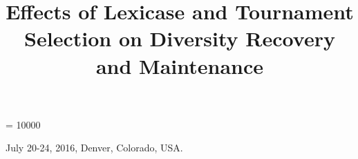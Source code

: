 \documentclass{sig-alternate-05-2015}
\begin{document}

\widowpenalty = 10000


 {July 20-24, 2016, Denver, Colorado, USA.}


%



\title{Effects of Lexicase and Tournament Selection on Diversity Recovery and Maintenance}

%
%
%
%
%
\end{document}
